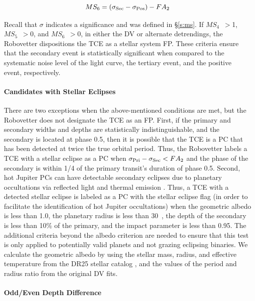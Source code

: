\begin{equation}
    MS_{6} = (\sigma_{\rm Sec} - \sigma_{\rm Pos}) - FA_{2}
\end{equation}

Recall that $\sigma$ indicates a significance and was defined in \S\ref{s:ms}. If $MS_{4}$~$>$1, $MS_{5}$~$>$0, and $MS_{6}$~$>$0, in either the DV or alternate detrendings, the Robovetter dispositions the TCE as a stellar system FP. These criteria ensure that the secondary event is statistically significant when compared to the systematic noise level of the light curve, the tertiary event, and the positive event, respectively.

\paragraph{Candidates with Stellar Eclipses}
\label{s:sscand}
There are two exceptions when the above-mentioned conditions are met, but the Robovetter does not designate the TCE as an FP. First, if the primary and secondary widths and depths are statistically indistinguishable, and the secondary is located at phase 0.5, then it is possible that the TCE is a PC that has been detected at twice the true orbital period. Thus, the Robovetter labels a TCE with a stellar eclipse as a PC when ${\sigma_{\rm Pri} - \sigma_{\rm Sec} < FA_{2}}$ and the phase of the secondary is within 1/4 of the primary transit's duration of phase 0.5. Second, hot Jupiter PCs can have detectable secondary eclipses due to planetary occultations via reflected light and thermal emission \citep{Coughlin2012}. Thus, a TCE with a detected stellar eclipse is labeled as a PC with the stellar eclipse flag (in order to facilitate the identification of hot Jupiter occultations) when the geometric albedo is less than 1.0, the planetary radius is less than 30~\re{}, the depth of the secondary is less than 10\% of the primary, and the impact parameter is less than 0.95. The additional criteria beyond the albedo criterion are needed to ensure that this test is only applied to potentially valid planets and not grazing eclipsing binaries. We calculate the geometric albedo by using the stellar mass, radius, and effective temperature from the DR25 stellar catalog \citep{Mathur2017ApJS}, and the values of the period and radius ratio from the original DV fits.



\paragraph{Odd/Even Depth Difference}

